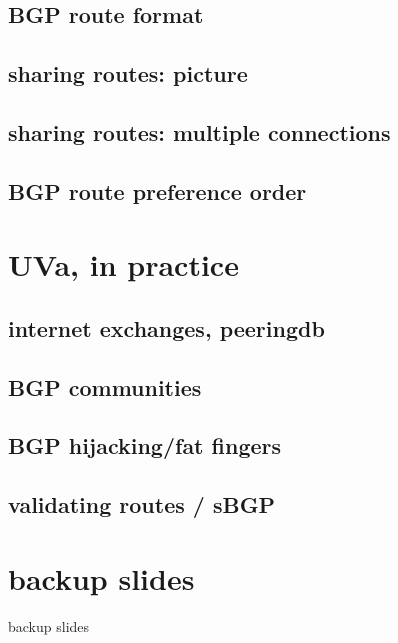 \subsection{BGP route format}


\subsection{sharing routes: picture}


\subsection{sharing routes: multiple connections}


\subsection{BGP route preference order}


\section{UVa, in practice}


\subsection{internet exchanges, peeringdb}


\subsection{BGP communities}


\subsection{BGP hijacking/fat fingers}


\subsection{validating routes / sBGP}






\section{backup slides}
\begin{frame}{backup slides}
\end{frame}


